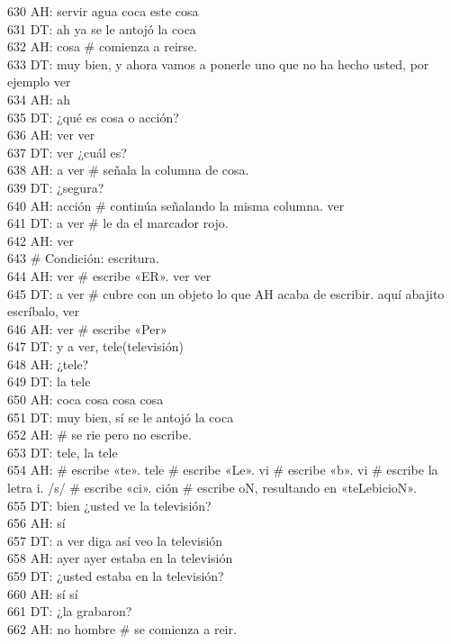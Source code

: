 630 AH: servir agua coca este cosa\\
631 DT: ah ya se le antojó la coca\\
632 AH: cosa \# comienza a reirse.\\
633 DT: muy bien, y ahora vamos a ponerle uno que no ha hecho usted, por ejemplo ver\\
634 AH: ah\\
635 DT: ¿qué es cosa o acción?\\
636 AH: ver ver\\
637 DT: ver ¿cuál es?\\
638 AH: a ver \# señala la columna de cosa.\\
639 DT: ¿segura?\\
640 AH: acción \# continúa señalando la misma columna. ver\\
641 DT: a ver \# le da el marcador rojo.\\
642 AH: ver\\
643 \# Condición: escritura.\\
644 AH: ver \# escribe «ER». ver ver \\
645 DT: a ver \# cubre con un objeto lo que AH acaba de escribir. aquí abajito escríbalo, ver\\
646 AH: ver \# escribe «Per»\\
647 DT: y a ver, tele(televisión)\\
648 AH: ¿tele?\\
649 DT: la tele\\
650 AH: coca cosa cosa cosa\\
651 DT: muy bien, sí se le antojó la coca\\
652 AH: \# se rie pero no escribe.\\
653 DT: tele, la tele\\
654 AH: \# escribe «te». tele \# escribe «Le». vi \# escribe «b». vi \# escribe la letra i. /s/ \# escribe «ci». ción \# escribe oN, resultando en «teLebicioN».\\
655 DT: bien ¿usted ve la televisión?\\
656 AH: sí\\
657 DT: a ver diga así veo la televisión\\
658 AH: ayer ayer estaba en la televisión\\
659 DT: ¿usted estaba en la televisión?\\
660 AH: sí sí\\
661 DT: ¿la grabaron?\\
662 AH: no hombre \# se comienza a reir.\\
